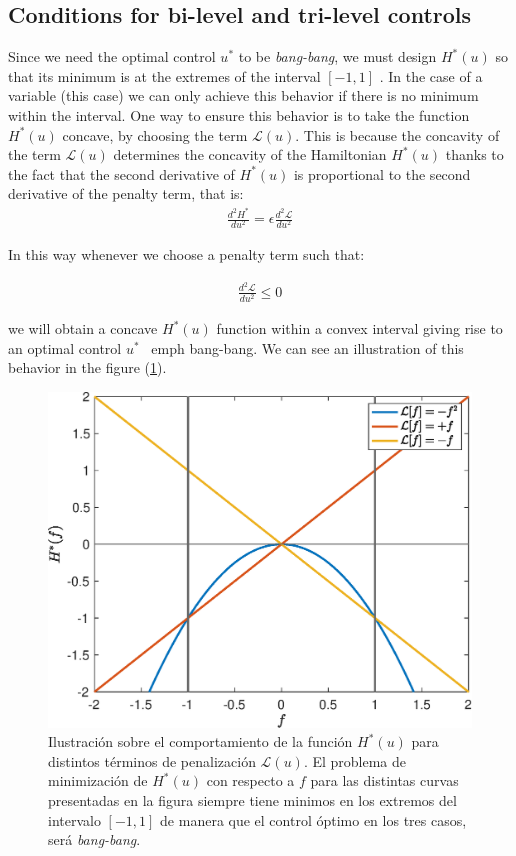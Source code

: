 \subsection{Conditions for bi-level and tri-level controls}
%
Since we need the optimal control $ u ^ * $ to be \emph {bang-bang}, we must design $ H ^ * (u) $ so that its minimum is at the extremes of the interval $ [- 1,1] $ .
%
In the case of a variable (this case) we can only achieve this behavior if there is no minimum within the interval.
%
One way to ensure this behavior is to take the function $ H ^ * (u) $ concave, by choosing the term $ \mathcal {L} (u) $.
%
This is because the concavity of the term $ \mathcal {L} (u) $ determines the concavity of the Hamiltonian $ H ^ * (u) $ thanks to the fact that the second derivative of $ H ^ * (u) $ is proportional to the second derivative of the penalty term, that is:
\begin{gather}
    \frac{d^2{H^*}}{du^2} = \epsilon \frac{d^2\mathcal{L}}{du^2} 
\end{gather}

In this way whenever we choose a penalty term such that:

\begin{gather}
    \frac{d^2\mathcal{L}}{du^2} \leq 0 
\end{gather}

we will obtain a concave $ H ^ * (u) $ function within a convex interval giving rise to an optimal control $ u ^ * $ \ emph {bang-bang}. We can see an illustration of this behavior in the figure (\ref {bang-bang}).
\newline

\begin{figure}[!ht]
    \centering
    \includegraphics[scale=0.5]{img/bang-bang.eps}
    \caption{Ilustración sobre el comportamiento de la función $H^*(u)$ para distintos términos de penalización $\mathcal{L}(u)$. El problema de minimización de $H^*(u)$ con respecto a $f$ para las distintas curvas presentadas en la figura siempre tiene minimos en los extremos del intervalo $[-1,1]$ de manera que el control óptimo en los tres casos, será \emph{bang-bang}.}
    \label{bang-bang}
\end{figure}

